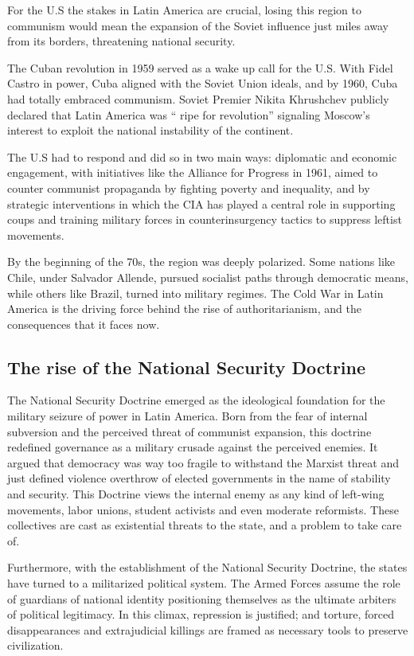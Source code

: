 For the U.S the stakes in Latin America are crucial, losing this region to communism would mean the expansion of the Soviet influence just miles away from its borders,  threatening national security.

The Cuban revolution in 1959 served as a wake up call for the U.S. With Fidel Castro in power, Cuba aligned with the Soviet Union ideals, and by 1960, Cuba had totally embraced communism. Soviet Premier Nikita Khrushchev publicly declared that Latin America was “ ripe for revolution” signaling Moscow's interest to exploit the national instability of the continent.

The U.S had to respond and did so in two main ways: diplomatic and economic engagement, with initiatives like the Alliance for Progress in 1961, aimed to counter communist propaganda by fighting poverty and inequality, and  by strategic interventions in which the CIA has played a central role in supporting coups and training military forces in counterinsurgency tactics to suppress leftist movements.

By the beginning of the 70s, the region was deeply polarized. Some nations like Chile, under Salvador Allende, pursued socialist paths through democratic means, while others like Brazil, turned into military regimes. The Cold War in Latin America is the driving force behind the rise of authoritarianism, and the consequences that it faces now.

\subsection{The rise of the National Security Doctrine}

The National Security Doctrine emerged as the ideological foundation for the military seizure of power in Latin America. Born from the fear of internal subversion and the perceived threat of communist expansion, this doctrine redefined governance as a military crusade against the perceived enemies. It argued that democracy was way too fragile to withstand the Marxist threat and just defined violence overthrow of elected governments in the name of stability and security. This Doctrine views the internal enemy as any kind of left-wing movements, labor unions, student activists and even moderate reformists.  These collectives are cast as existential threats to the state, and a problem to take care of.

Furthermore, with the establishment of the National Security Doctrine, the states have turned to a militarized political system. The Armed Forces assume the role of guardians of national identity positioning themselves as the ultimate arbiters of political legitimacy. In this climax, repression is justified; and torture, forced disappearances and extrajudicial killings are framed as necessary tools to preserve civilization.

